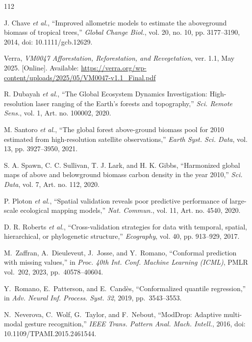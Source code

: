 \documentclass[conference,a4paper]{IEEEtran}
\begin{document}
\begin{thebibliography}{112}

J. Chave \textit{et al.}, ``Improved allometric models to estimate the aboveground biomass of tropical trees,'' \textit{Global Change Biol.}, vol. 20, no. 10, pp. 3177--3190, 2014, doi: 10.1111/gcb.12629.

Verra, \textit{VM0047 Afforestation, Reforestation, and Revegetation}, ver. 1.1, May 2025. [Online]. Available: \url{https://verra.org/wp-content/uploads/2025/05/VM0047-v1.1_Final.pdf}

R. Dubayah \textit{et al.}, ``The Global Ecosystem Dynamics Investigation: High-resolution laser ranging of the Earth's forests and topography,'' \textit{Sci. Remote Sens.}, vol. 1, Art. no. 100002, 2020.

M. Santoro \textit{et al.}, ``The global forest above-ground biomass pool for 2010 estimated from high-resolution satellite observations,'' \textit{Earth Syst. Sci. Data}, vol. 13, pp. 3927--3950, 2021.

S. A. Spawn, C. C. Sullivan, T. J. Lark, and H. K. Gibbs, ``Harmonized global maps of above and belowground biomass carbon density in the year 2010,'' \textit{Sci. Data}, vol. 7, Art. no. 112, 2020.

P. Ploton \textit{et al.}, ``Spatial validation reveals poor predictive performance of large-scale ecological mapping models,'' \textit{Nat. Commun.}, vol. 11, Art. no. 4540, 2020.

D. R. Roberts \textit{et al.}, ``Cross-validation strategies for data with temporal, spatial, hierarchical, or phylogenetic structure,'' \textit{Ecography}, vol. 40, pp. 913--929, 2017.

M.~Zaffran, A.~Dieuleveut, J.~Josse, and Y.~Romano, ``Conformal prediction with missing values,'' in \textit{Proc. 40th Int. Conf. Machine Learning (ICML)}, PMLR vol.~202, 2023, pp.~40578--40604.

Y.~Romano, E.~Patterson, and E.~Cand\`es, ``Conformalized quantile regression,'' in \textit{Adv. Neural Inf. Process. Syst. 32}, 2019, pp.~3543--3553.

N.~Neverova, C.~Wolf, G.~Taylor, and F.~Nebout, ``ModDrop: Adaptive multi-modal gesture recognition,'' \textit{IEEE Trans. Pattern Anal. Mach. Intell.}, 2016, doi: 10.1109/TPAMI.2015.2461544.


\end{thebibliography}
\end{document}
